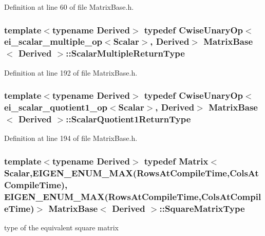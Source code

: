 Definition at line 60 of file Matrix\-Base.\-h.

\hypertarget{class_matrix_base_a9230932303a92e0e58314d0daee8a9e6}{
\subsubsection[{Scalar\-Multiple\-Return\-Type}]{\setlength{\rightskip}{0pt plus 5cm}template$<$typename Derived$>$ typedef {\bf Cwise\-Unary\-Op}$<${\bf ei\-\_\-scalar\-\_\-multiple\-\_\-op}$<${\bf Scalar}$>$, Derived$>$ {\bf Matrix\-Base}$<$ Derived $>$\-::{\bf Scalar\-Multiple\-Return\-Type}}}\label{class_matrix_base_a9230932303a92e0e58314d0daee8a9e6}


Definition at line 192 of file Matrix\-Base.\-h.

\hypertarget{class_matrix_base_aa82ce34efc5aad466c40b21933f59f94}{
\subsubsection[{Scalar\-Quotient1\-Return\-Type}]{\setlength{\rightskip}{0pt plus 5cm}template$<$typename Derived$>$ typedef {\bf Cwise\-Unary\-Op}$<${\bf ei\-\_\-scalar\-\_\-quotient1\-\_\-op}$<${\bf Scalar}$>$, Derived$>$ {\bf Matrix\-Base}$<$ Derived $>$\-::{\bf Scalar\-Quotient1\-Return\-Type}}}\label{class_matrix_base_aa82ce34efc5aad466c40b21933f59f94}


Definition at line 194 of file Matrix\-Base.\-h.

\hypertarget{class_matrix_base_a7f198324e9378d401b50e6aa5fc289ae}{
\subsubsection[{Square\-Matrix\-Type}]{\setlength{\rightskip}{0pt plus 5cm}template$<$typename Derived$>$ typedef {\bf Matrix}$<${\bf Scalar},E\-I\-G\-E\-N\-\_\-\-E\-N\-U\-M\-\_\-\-M\-A\-X({\bf Rows\-At\-Compile\-Time},{\bf Cols\-At\-Compile\-Time}), E\-I\-G\-E\-N\-\_\-\-E\-N\-U\-M\-\_\-\-M\-A\-X({\bf Rows\-At\-Compile\-Time},{\bf Cols\-At\-Compile\-Time})$>$ {\bf Matrix\-Base}$<$ Derived $>$\-::{\bf Square\-Matrix\-Type}}}\label{class_matrix_base_a7f198324e9378d401b50e6aa5fc289ae}
type of the equivalent square matrix 

